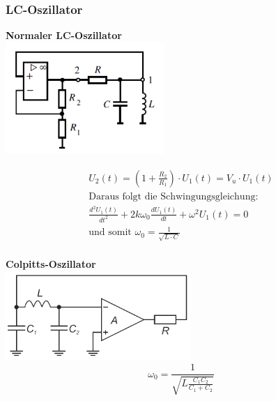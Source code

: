 	\subsubsection{LC-Oszillator}
		\begin{multicols}{2}
		
			\textbf{Normaler LC-Oszillator} \\
			\includegraphics[width=6cm]{images/lcOszillator} 
			
			\begin{multline*}	
				U_2(t) = (1+\frac{R_2}{R_1}) \cdot U_1(t) = V_u \cdot U_1(t) \\
				\text{Daraus folgt die Schwingungsgleichung:} \\
				\frac{d^2 U_1(t)}{dt^2}+2k\omega_0 \frac{dU_1(t)}{dt}+\omega^2U_1(t)=0 \\
				\text{und somit } \omega_0 = \frac{1}{\sqrt{L\cdot C}} \\
			\end{multline*}
			
		\columnbreak
		
			\textbf{Colpitts-Oszillator} \\
			\includegraphics[width=7cm]{images/osziLC.png} \\
		
			\[ \omega_0=\frac{1}{\sqrt{L\frac{C_1 C_2}{C_1+C_2}}} \] \\
		\end{multicols}


